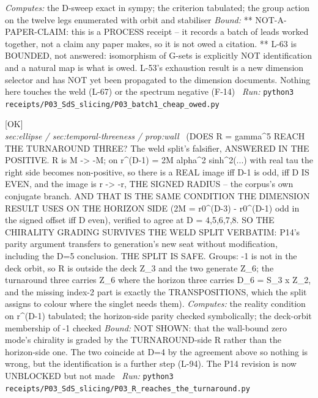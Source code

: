 \begin{description}
\emph{Computes:} the D-sweep exact in sympy; the criterion tabulated; the group action on the twelve legs enumerated with orbit and stabiliser
 \emph{Bound:} ** NOT-A-PAPER-CLAIM: this is a PROCESS receipt -- it records a batch of leads worked together, not a claim any paper makes, so it is not owed a citation. ** L-63 is BOUNDED, not answered: isomorphism of G-sets is explicitly NOT identification and a natural map is what is owed. L-53's exhaustion result is a new dimension selector and has NOT yet been propagated to the dimension documents. Nothing here touches the weld (L-67) or the spectrum negative (F-14)
\ \emph{Run:} \texttt{python3 receipts/P03\_SdS\_slicing/P03\_batch1\_cheap\_owed.py}
\item[\label{rcpt:P03_R_reaches_the_turnaround}\texttt{P03\_R\_reaches\_the\_turnaround}]\hfill\textsf{[OK]}\\
\textit{sec:ellipse / sec:temporal-threeness / prop:wall} \ (DOES R = gamma\textasciicircum{}5 REACH THE TURNAROUND THREE? The weld split's falsifier, ANSWERED IN THE POSITIVE. R is M -> -M; on r\textasciicircum{}(D-1) = 2M alpha\textasciicircum{}2 sinh\textasciicircum{}2(...) with real tau the right side becomes non-positive, so there is a REAL image iff D-1 is odd, iff D IS EVEN, and the image is r -> -r, THE SIGNED RADIUS -- the corpus's own conjugate branch. AND THAT IS THE SAME CONDITION THE DIMENSION RESULT USES ON THE HORIZON SIDE (2M = r0\textasciicircum{}(D-3) - r0\textasciicircum{}(D-1) odd in the signed offset iff D even), verified to agree at D = 4,5,6,7,8. SO THE CHIRALITY GRADING SURVIVES THE WELD SPLIT VERBATIM: P14's parity argument transfers to generation's new seat without modification, including the D=5 conclusion. THE SPLIT IS SAFE. Groups: -1 is not in the deck orbit, so R is outside the deck Z\_3 and the two generate Z\_6; the turnaround three carries Z\_6 where the horizon three carries D\_6 = S\_3 x Z\_2, and the missing index-2 part is exactly the TRANSPOSITIONS, which the split assigns to colour where the singlet needs them). 
\emph{Computes:} the reality condition on r\textasciicircum{}(D-1) tabulated; the horizon-side parity checked symbolically; the deck-orbit membership of -1 checked
 \emph{Bound:} NOT SHOWN: that the wall-bound zero mode's chirality is graded by the TURNAROUND-side R rather than the horizon-side one. The two coincide at D=4 by the agreement above so nothing is wrong, but the identification is a further step (L-94). The P14 revision is now UNBLOCKED but not made
\ \emph{Run:} \texttt{python3 receipts/P03\_SdS\_slicing/P03\_R\_reaches\_the\_turnaround.py}

\end{description}
